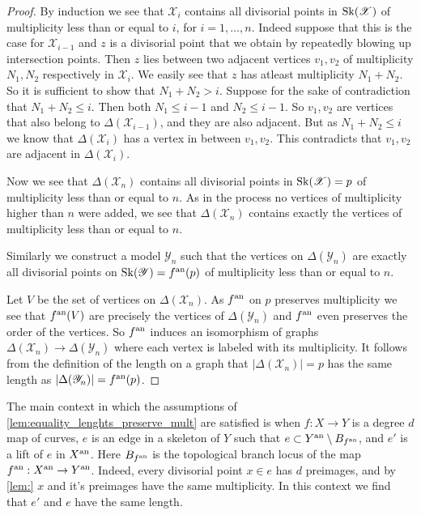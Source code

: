 \begin{proof}
	By induction we see that $\mathscr X_i$ contains all divisorial points in $\operatorname{Sk}(\mathscr X)$ of multiplicity less than or equal to $i$, for $i = 1, \ldots, n$. 
	Indeed suppose that this is the case for $\mathscr X_{i -1}$ and $z$ is a divisorial point that we obtain by repeatedly blowing up intersection points.
	Then  $z$ lies between two adjacent vertices $v_1, v_2$ of multiplicity $N_1, N_2$ respectively in $\mathscr X_{i}$. 
	We easily see that $z$ has atleast multiplicity $N_1 + N_2$. 
	So it is sufficient to show that $N_1 + N_2 > i$. 
	Suppose for the sake of contradiction that $N_1 + N_2 \le i$.
	Then both $N_1 \le i -1$ and $N_2 \le i-1$. 
	So $v_1, v_2$ are vertices that also belong to $\Delta(\mathscr X_{i-1})$, and they are also adjacent. 
	But as $N_1 + N_2 \le i$ we know that $\Delta(\mathscr X_{i})$ has a vertex in between $v_1, v_2$. This contradicts that $v_1, v_2$ are adjacent in $\Delta(\mathscr X_{i})$. 

	Now we see that $\Delta(\mathscr X_n)$ contains all divisorial points in $\operatorname{Sk}(\mathscr X) = p$ of multiplicity less than or equal to $n$. 
	As in the process no vertices of multiplicity higher than $n$ were added, we see that $\Delta(\mathscr X_n)$ contains exactly the vertices of multiplicity less than or equal to $n$. 

	Similarly we construct a model $\mathscr Y_n$ such that the vertices on  $\Delta(\mathscr Y_n)$ are exactly all divisorial points on $\operatorname{Sk}(\mathscr Y) = f{}^{\text{an}}(p)$ of multiplicity less than or equal to $n$. 

	Let $V$ be the set of vertices on $\Delta(\mathscr X_n)$. 
	As $f{}^{\text{an}} $ on $p$ preserves multiplicity we see that $f{}^{\text{an}}(V)$ are precisely the vertices of $\Delta(\mathscr Y_n)$ and $f{}^{\text{an}}$ even preserves the order of the vertices. 
	So $f{}^{\text{an}}$ induces an isomorphism of graphs $\Delta(\mathscr X_n) \to \Delta(\mathscr Y_n)$ where each vertex is labeled with its multiplicity. 
	It follows from the definition of the length on a graph that $|\Delta(\mathscr X_n)| = p$ has the same length as $|\Delta(\mathscr Y_n)| = f{}^{\text{an}}(p)$. 
\end{proof}

\begin{remark}\label{rem:length_edge_skeleton_cover}
	The main context in which the assumptions of \cref{lem:equality_lenghts_preserve_mult} are satisfied is when $f:X \to Y$ is a degree $d$ map of curves, $e$ is an edge in a skeleton of $Y$ such that $e \subset Y{}^{\text{an}} \setminus B_{f{}^{\text{an}}}$, and $e'$ is a lift of $e$ in $X{}^{\text{an}}$. 
	Here $B_{f{}^{\text{an}}}$ is the topological branch locus of the map $f{}^{\text{an}}: X{}^{\text{an}} \to Y{}^{\text{an}}$.
	Indeed, every divisorial point $x \in e$ has $d$ preimages, and by \cref{lem:} $x$ and it's preimages have the same multiplicity. 
	In this context we find that $e'$ and $e$ have the same length. 
\end{remark}

